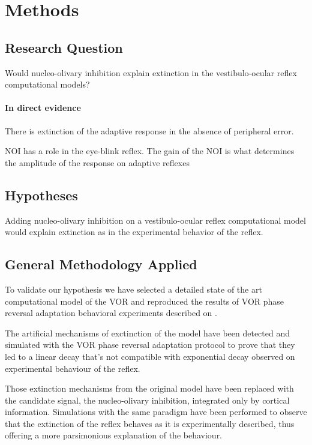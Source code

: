 \documentclass[12pt, a4paper,twoside]{tesi_upf}
\begin{document}
\chapter{Methods}

\section{Research Question}

Would nucleo-olivary inhibition explain extinction in the vestibulo-ocular reflex computational models?

\subsubsection{In direct evidence}

There is extinction of the adaptive response in the absence of peripheral error.

NOI has a role in the eye-blink reflex. The gain of the NOI is what determines the amplitude of the response on adaptive reflexes \cite{Emken2007, Herreros2013b}

\section{Hypotheses}

Adding nucleo-olivary inhibition on a vestibulo-ocular reflex computational model would explain extinction as in the experimental behavior of the reflex.

\section{General Methodology Applied}

To validate our hypothesis we have selected a detailed state of the art computational model of the VOR \cite{Clopath2014} and reproduced the results of VOR phase reversal adaptation behavioral experiments described on \cite{Wulff2009a}.

The artificial mechanisms of exctinction of the model have been detected and simulated with the VOR phase reversal adaptation protocol to prove that they led to a linear decay that's not compatible with exponential decay observed on experimental behaviour of the reflex.

Those extinction mechanisms from the original model have been replaced with the candidate signal, the nucleo-olivary inhibition, integrated only by cortical information. Simulations with the same paradigm have been performed to observe that the extinction of the reflex behaves as it is experimentally described, thus offering a more parsimonious explanation of the behaviour.
\end{document}
